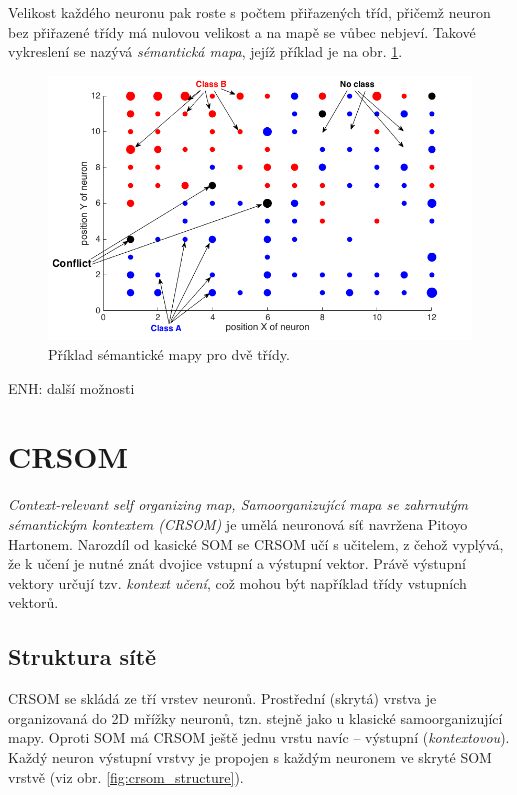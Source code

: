 \documentclass[thesis=M,czech]{FITthesis}[2012/06/26]
\begin{document}
Velikost každého neuronu pak roste s počtem přiřazených tříd, přičemž neuron bez přiřazené třídy má nulovou velikost a na mapě se vůbec nebjeví. Takové vykreslení se nazývá \textit{sémantická mapa}, jejíž příklad je na obr. \ref{fig:semanticmap}.


\begin{figure}[htbp]
\begin{center}
	\includegraphics[scale=0.4]{semantic_map.png}
\caption{Příklad sémantické mapy pro dvě třídy.}
\label{fig:semanticmap}
\end{center}
\end{figure}


ENH: další možnosti



\section{CRSOM}
\textit{Context-relevant self organizing map, Samoorganizující mapa se zahrnutým sémantickým kontextem (CRSOM)} je umělá neuronová síť navržena Pitoyo Hartonem. Narozdíl od kasické SOM se CRSOM učí s učitelem, z čehož vyplývá, že k učení je nutné znát dvojice vstupní a výstupní vektor. Právě výstupní vektory určují tzv. \textit{kontext učení}, což mohou být například třídy vstupních vektorů.

\subsection{Struktura sítě}
CRSOM se skládá ze tří vrstev neuronů. Prostřední (skrytá) vrstva je organizovaná do 2D mřížky neuronů, tzn. stejně jako u klasické samoorganizující mapy.
 Oproti SOM má CRSOM ještě jednu vrstu navíc -- výstupní (\textit{kontextovou}).  Každý neuron výstupní vrstvy je propojen s každým neuronem ve skryté SOM vrstvě (viz obr. \ref{fig:crsom_structure}). 
 
\end{document}

